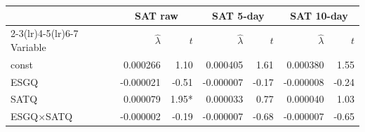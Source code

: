 \begin{tabular}{lrrrrrr}
\toprule
& \multicolumn{2}{c}{SAT raw} & \multicolumn{2}{c}{SAT 5-day} & \multicolumn{2}{c}{SAT 10-day} \\
\cmidrule(lr){2-3}\cmidrule(lr){4-5}\cmidrule(lr){6-7}
Variable & $\hat{\lambda}$ & $t$ & $\hat{\lambda}$ & $t$ & $\hat{\lambda}$ & $t$ \\
\midrule
const & 0.000266 & 1.10 & 0.000405 & 1.61 & 0.000380 & 1.55 \\
ESGQ & -0.000021 & -0.51 & -0.000007 & -0.17 & -0.000008 & -0.24 \\
SATQ & 0.000079 & 1.95* & 0.000033 & 0.77 & 0.000040 & 1.03 \\
ESGQ$\times$SATQ & -0.000002 & -0.19 & -0.000007 & -0.68 & -0.000007 & -0.65 \\
\bottomrule
\end{tabular}